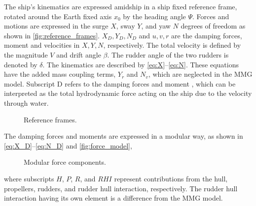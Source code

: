 The ship's kinematics are expressed amidship in a ship fixed reference frame, rotated around the Earth fixed axis $x_0$ by the heading angle \(\Psi\). Forces and motions are expressed in the surge $X$, sway $Y$, and yaw $N$ degrees of freedom as shown in \autoref{fig:reference_frames}. 
$X_D,Y_D,N_D$ and $u,v,r$ are the damping forces, moment and velocities in $X,Y,N$, respectively.
The total velocity is defined by the magnitude \(V\) and drift angle \(\beta\). The rudder angle of the two rudders is denoted by \(\delta\).
The kinematics are described by \autoref{eq:X}--\autoref{eq:N}. 
These equations have the added mass coupling terms, $Y_{\dot{r}}$ and $N_{\dot{v}}$, which are neglected in the MMG model. Subscript D refers to the damping forces and moment \citep{fossen_handbook_2021}, which can be interpreted as the total hydrodynamic force acting on the ship due to the velocity through water.
%
\begin{figure}[h]
    \centering
    
    \caption{Reference frames.}
    \label{fig:reference_frames}
\end{figure}
%
\begin{equation}
    \label{eq:X}
    
\end{equation}
%
\begin{equation}
    \label{eq:Y}
    
\end{equation}
%
\begin{equation}
    \label{eq:N}
    
\end{equation}
The damping forces and moments are expressed in a modular way, as shown in \autoref{eq:X_D}--\autoref{eq:N_D} and \autoref{fig:force_model},
\begin{equation}
    \label{eq:X_D}
    
\end{equation}
%
\begin{equation}
    \label{eq:Y_D}
    
\end{equation}
%
\begin{equation}
    \label{eq:N_D}
    
\end{equation}
%
\begin{figure}[h]
    \centering
    
    \caption{Modular force components.}
    \label{fig:force_model}
\end{figure}
where subscripts $H$, $P$, $R$, and $RHI$ represent contributions from the hull, propellers, rudders, and rudder hull interaction, respectively. The rudder hull interaction having its own element is a difference from the MMG model.

